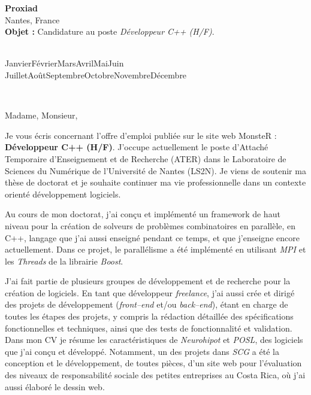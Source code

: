\documentclass[11pt,a4paper]{letter} %
\def\today{\number\day\space\ifcase\month\or
  Janvier\or Février\or Mars\or Avril\or Mai\or Juin\or
  Juillet\or Août\or Septembre\or Octobre\or Novembre\or Décembre\fi
  \space\number\year}
\def\opening#1{\thispagestyle{empty}
{\centering\fromaddress \vspace{0.6in} \\ %
\hspace{6cm}\today\hspace*{\fill}\par} %
{\raggedright \toname \\ \toaddress \par} %
\vspace{0.4in} %
\noindent #1 %
}
\newcommand{\poste}{Développeur C++ (H/F)}
\newcommand{\where}{publiée sur le site web MonsteR :~}
\newcommand{\intro}{Je vous écris concernant l'offre d'emploi \where 
\textbf{\poste}. 
J'occupe actuellement le poste d'Attaché Temporaire d'Enseignement et de Recherche (ATER) dans le Laboratoire de Sciences du Numérique de l'Université de Nantes (LS2N). Je viens de soutenir ma thèse de doctorat et je souhaite continuer ma vie professionnelle dans un contexte orienté développement logiciels.}
\begin{document}

\begin{letter}
{{\bf Proxiad}\\Nantes, France\\
\vspace{0.2in}
\textbf{Objet :} Candidature au poste \textit{\poste}.
}


\opening{Madame, Monsieur,}

\intro{}

Au cours de mon doctorat, j'ai con\c cu et implémenté un framework de haut niveau pour la création de solveurs de problèmes combinatoires en parallèle, en C++, langage que j'ai aussi enseigné pendant ce temps, et que j'enseigne encore actuellement. 
Dans ce projet, le parallélisme a été implémenté en utilisant \textit{MPI} et les \textit{Threads} de la librairie \textit{Boost}.

J'ai fait partie de plusieurs groupes de développement et de recherche pour la création de logiciels. En tant que développeur \textit{freelance}, j'ai aussi crée et dirigé des projets de développement (\textit{front--end} et/ou \textit{back--end}), étant en charge de toutes les étapes des projets, y compris la rédaction détaillée des spécifications fonctionnelles et techniques, ainsi que des tests de fonctionnalité et validation.
Dans mon CV je résume les caractéristiques de \textit{Neurohipot} et \textit{POSL}, des logiciels que j'ai conçu et développé. Notamment, un des projets dans \textit{SCG} a été la conception et le développement, de toutes pièces, d'un site web pour l'évaluation des niveaux de responsabilité sociale des petites entreprises au Costa Rica, où j'ai aussi élaboré le dessin web.


\end{letter}
\end{document}
